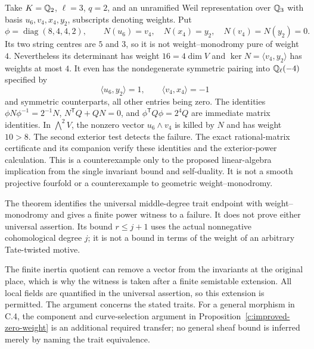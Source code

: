 \begin{example}
\label{c:single-endpoint-insufficient}
Take $K=\mathbb Q_2$, $\ell=3$, $q=2$, and an unramified Weil
representation over $\mathbb Q_3$ with basis
$u_6,v_4,x_4,y_2$, subscripts denoting weights.  Put
\[
 \phi=\operatorname{diag}(8,4,4,2),\qquad
 N(u_6)=v_4,\quad N(x_4)=y_2,\quad N(v_4)=N(y_2)=0.
\]
Its two string centres are $5$ and $3$, so it is not
weight--monodromy pure of weight $4$.  Nevertheless
its determinant has weight $16=4\dim V$ and
$\ker N=\langle v_4,y_2\rangle$ has weights at most $4$.
It even has the nondegenerate symmetric pairing into
$\mathbb Q_\ell(-4)$ specified by
\[
 \langle u_6,y_2\rangle=1,\qquad
 \langle v_4,x_4\rangle=-1
\]
and symmetric counterparts, all other entries being zero.
The identities $\phi N\phi^{-1}=2^{-1}N$,
$N^{\mathsf T}Q+QN=0$, and
$\phi^{\mathsf T}Q\phi=2^4Q$ are immediate matrix identities.
In $\bigwedge^2V$, the nonzero vector $u_6\wedge v_4$
is killed by $N$ and has weight $10>8$.
The second exterior test detects the failure.
The exact rational-matrix certificate
and its companion
verify these identities and the exterior-power calculation.
This is a counterexample only to the proposed linear-algebra
implication from the single invariant bound and self-duality.
It is not a smooth projective fourfold or a counterexample
to geometric weight--monodromy.
\end{example}

\begin{remark}
\label{c:trait-exterior-scope}
The theorem identifies the universal middle-degree trait
endpoint with weight--monodromy and gives a finite power
witness to a failure.  It does not prove either universal
assertion.  Its bound $r\leq j+1$ uses the actual nonnegative
cohomological degree $j$; it is not a bound in terms of the
weight of an arbitrary Tate-twisted motive.

The finite inertia quotient can remove a vector from the
invariants at the original place, which is why the witness
is taken after a finite semistable extension.  All local fields
are quantified in the universal assertion, so this extension
is permitted.  The argument concerns the stated traits.
For a general morphism in C.4, the component and curve-selection
argument in Proposition~\ref{c:improved-zero-weight} is an
additional required transfer; no general sheaf bound is
inferred merely by naming the trait equivalence.
\end{remark}

